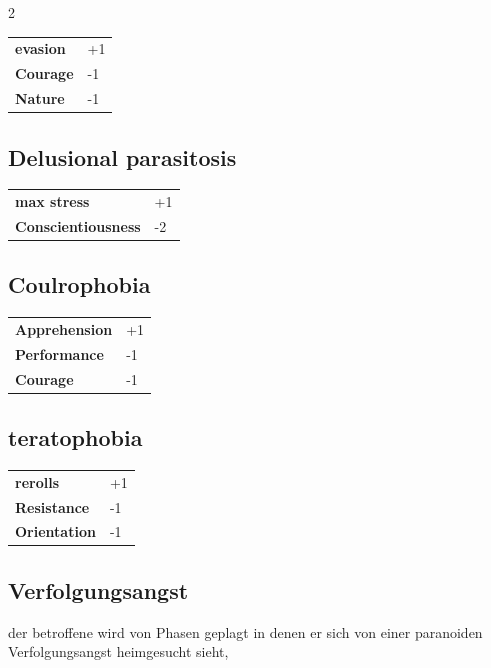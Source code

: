 \begin{multicols}{2}
    \begin{tabular}{@{}ll@{}}
        \textbf{evasion} & +1\\
        \textbf{Courage} & -1\\
        \textbf{Nature} & -1\\
    \end{tabular}

    \subsection*{Delusional parasitosis}




    \begin{tabular}{@{}ll@{}}
        \textbf{max stress} & +1\\
        \textbf{Conscientiousness} & -2\\
    \end{tabular}

    \subsection*{Coulrophobia}




    \begin{tabular}{@{}ll@{}}
        \textbf{Apprehension} & +1\\
        \textbf{Performance} & -1\\
        \textbf{Courage} & -1\\
    \end{tabular}

    \subsection*{teratophobia}




    \begin{tabular}{@{}ll@{}}
        \textbf{rerolls} & +1\\
        \textbf{Resistance} & -1\\
        \textbf{Orientation} & -1\\
    \end{tabular}

    \subsection*{Verfolgungsangst}

    der betroffene wird von Phasen geplagt in denen er sich von einer paranoiden Verfolgungsangst heimgesucht sieht,




\end{multicols}
